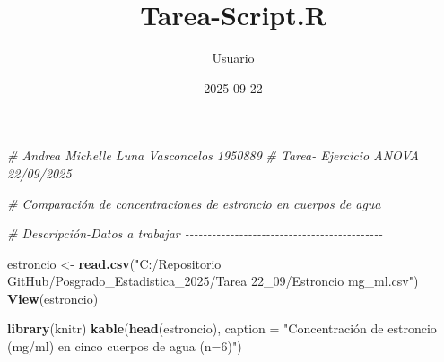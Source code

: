 \documentclass[
]{article}
\title{Tarea-Script.R}
\author{Usuario}
\date{2025-09-22}
\newenvironment{Shaded}{\begin{snugshade}}{\end{snugshade}}
\newcommand{\AttributeTok}[1]{\textcolor[rgb]{0.13,0.29,0.53}{#1}}
\newcommand{\CommentTok}[1]{\textcolor[rgb]{0.56,0.35,0.01}{\textit{#1}}}
\newcommand{\FunctionTok}[1]{\textcolor[rgb]{0.13,0.29,0.53}{\textbf{#1}}}
\newcommand{\NormalTok}[1]{#1}
\newcommand{\OtherTok}[1]{\textcolor[rgb]{0.56,0.35,0.01}{#1}}
\newcommand{\StringTok}[1]{\textcolor[rgb]{0.31,0.60,0.02}{#1}}
\begin{document}
\maketitle

\begin{Shaded}
\begin{Highlighting}[]
\CommentTok{\# Andrea Michelle Luna Vasconcelos 1950889}
\CommentTok{\# Tarea{-} Ejercicio ANOVA 22/09/2025}

\CommentTok{\# Comparación de concentraciones de estroncio en cuerpos de agua}

\CommentTok{\# Descripción{-}Datos a trabajar {-}{-}{-}{-}{-}{-}{-}{-}{-}{-}{-}{-}{-}{-}{-}{-}{-}{-}{-}{-}{-}{-}{-}{-}{-}{-}{-}{-}{-}{-}{-}{-}{-}{-}{-}{-}{-}{-}{-}{-}{-}{-}{-}{-}}

\NormalTok{estroncio }\OtherTok{\textless{}{-}} \FunctionTok{read.csv}\NormalTok{(}\StringTok{"C:/Repositorio GitHub/Posgrado\_Estadistica\_2025/Tarea 22\_09/Estroncio mg\_ml.csv"}\NormalTok{)}
\FunctionTok{View}\NormalTok{(estroncio)}

\FunctionTok{library}\NormalTok{(knitr)}
\FunctionTok{kable}\NormalTok{(}\FunctionTok{head}\NormalTok{(estroncio), }\AttributeTok{caption =} \StringTok{"Concentración de estroncio (mg/ml)}
\StringTok{      en cinco cuerpos de agua (n=6)"}\NormalTok{)}
\end{Highlighting}
\end{Shaded}
\end{document}
